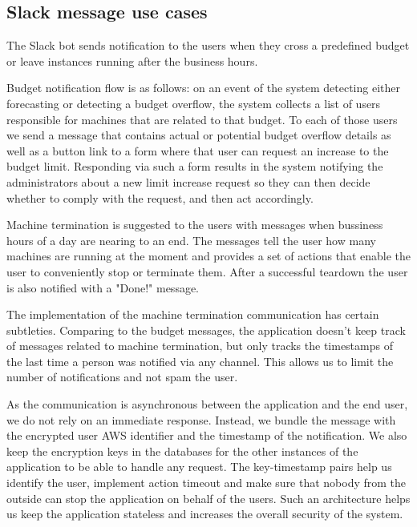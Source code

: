 \documentclass[licencjacka,en]{thesisclass}
\begin{document}
    \subsection{Slack message use cases}

    The Slack bot sends notification to the users when they cross
    a predefined budget or leave instances running after the business hours.

    Budget notification flow is as follows: on an event of the system detecting
    either forecasting or detecting a budget overflow, the system collects
    a list of users responsible for machines that are related to that budget.
    To each of those users we send a message that contains actual or potential
    budget overflow details as well as a button link to a form where that user can request
    an increase to the budget limit.
    Responding via such a form results in the system notifying the administrators
    about a new limit increase request so they can then decide whether to comply
    with the request, and then act accordingly.

    Machine termination is suggested to the users with messages
    when bussiness hours of a day are nearing to an end.
    The messages tell the user how many machines are running at the moment
    and provides a set of actions that enable the user to conveniently stop
    or terminate them.
    After a successful teardown the user is also notified with a "Done!" message.

    The implementation of the machine termination communication has certain subtleties.
    Comparing to the budget messages, the application doesn’t keep track of messages
    related to machine termination, but
    only tracks the timestamps of the last time a person was notified via any channel.
    This allows us to limit the number of notifications and not spam the user.

    As the communication is asynchronous between the application and the end user,
    we do not rely on an immediate response.
    Instead, we bundle the message with the encrypted user AWS identifier
    and the timestamp of the notification.
    We also keep the encryption keys in the databases for the other instances
    of the application to be able to handle any request.
    The key-timestamp pairs help us identify the user, implement action timeout
    and make sure that nobody from the outside can stop the application
    on behalf of the users.
    Such an architecture helps us keep the application stateless
    and increases the overall security of the system.
\end{document}
